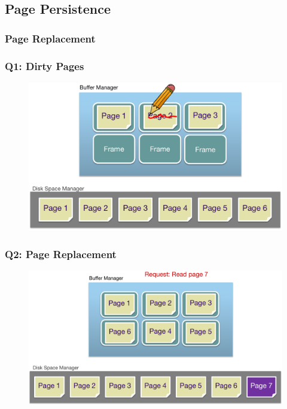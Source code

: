 \subsection{Page Persistence}

\subsubsection{Page Replacement}

\begin{frame}[fragile]
	\frametitle{Q1: Dirty Pages}
	\begin{figure}
		\includegraphics[width=.68\linewidth]{figs/dbfile-dirtypage.pdf}
	\end{figure}
\end{frame}

\begin{frame}[fragile]
	\frametitle{Q2: Page Replacement}
	\begin{figure}
		\includegraphics[width=.68\linewidth]{figs/dbfile-replacement.pdf}
	\end{figure}
\end{frame}

